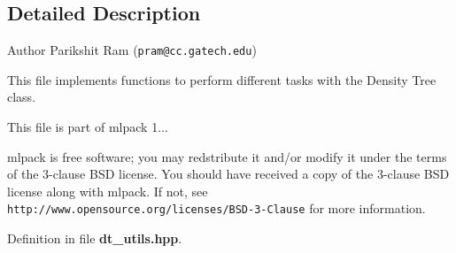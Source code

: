 \subsection{Detailed Description}
\begin{DoxyAuthor}{Author}
Parikshit Ram ({\tt pram@cc.\-gatech.\-edu})
\end{DoxyAuthor}
This file implements functions to perform different tasks with the Density Tree class.

This file is part of mlpack 1...

mlpack is free software; you may redstribute it and/or modify it under the terms of the 3-\/clause B\-S\-D license. You should have received a copy of the 3-\/clause B\-S\-D license along with mlpack. If not, see {\tt http\-://www.\-opensource.\-org/licenses/\-B\-S\-D-\/3-\/\-Clause} for more information. 

Definition in file {\bf dt\-\_\-utils.\-hpp}.

